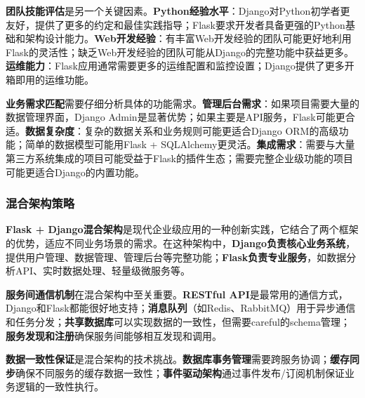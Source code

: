 \textbf{团队技能评估}是另一个关键因素。\textbf{Python经验水平}：Django对Python初学者更友好，提供了更多的约定和最佳实践指导；Flask要求开发者具备更强的Python基础和架构设计能力。\textbf{Web开发经验}：有丰富Web开发经验的团队可能更好地利用Flask的灵活性；缺乏Web开发经验的团队可能从Django的完整功能中获益更多。\textbf{运维能力}：Flask应用通常需要更多的运维配置和监控设置；Django提供了更多开箱即用的运维功能。

\textbf{业务需求匹配}需要仔细分析具体的功能需求。\textbf{管理后台需求}：如果项目需要大量的数据管理界面，Django Admin是显著优势；如果主要是API服务，Flask可能更合适。\textbf{数据复杂度}：复杂的数据关系和业务规则可能更适合Django ORM的高级功能；简单的数据模型可能用Flask + SQLAlchemy更灵活。\textbf{集成需求}：需要与大量第三方系统集成的项目可能受益于Flask的插件生态；需要完整企业级功能的项目可能更适合Django的内置功能。

\subsubsection{混合架构策略}\label{ux6df7ux5408ux67b6ux6784ux7b56ux7565}

\textbf{Flask + Django混合架构}是现代企业级应用的一种创新实践，它结合了两个框架的优势，适应不同业务场景的需求。在这种架构中，\textbf{Django负责核心业务系统}，提供用户管理、数据管理、管理后台等完整功能；\textbf{Flask负责专业服务}，如数据分析API、实时数据处理、轻量级微服务等。

\textbf{服务间通信机制}在混合架构中至关重要。\textbf{RESTful API}是最常用的通信方式，Django和Flask都能很好地支持；\textbf{消息队列}（如Redis、RabbitMQ）用于异步通信和任务分发；\textbf{共享数据库}可以实现数据的一致性，但需要careful的schema管理；\textbf{服务发现和注册}确保服务间能够相互发现和调用。

\textbf{数据一致性保证}是混合架构的技术挑战。\textbf{数据库事务管理}需要跨服务协调；\textbf{缓存同步}确保不同服务的缓存数据一致性；\textbf{事件驱动架构}通过事件发布/订阅机制保证业务逻辑的一致性执行。

